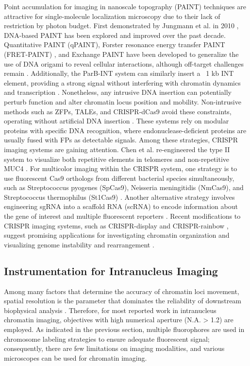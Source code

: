 Point accumulation for imaging in nanoscale topography (PAINT) techniques are attractive for single-molecule localization microscopy due to their lack of restriction by photon budget. First demonstrated by Jungmann et al. in 2010 \parencite{Jungmann2016}, DNA-based PAINT has been explored and improved over the past decade. Quantitative PAINT (qPAINT), Forster resonance energy transfer PAINT (FRET-PAINT) \parencite{Jungmann2016}, and Exchange PAINT have been developed to generalize the use of DNA origami to reveal cellular interactions, although off-target challenges remain \parencite{Nieves2018}. Additionally, the ParB-INT system can similarly insert a ~1 kb INT element, providing a strong signal without interfering with chromatin dynamics and transcription \parencite{Saad2014}. Nonetheless, any intrusive DNA insertion can potentially perturb function and alter chromatin locus position and mobility. Non-intrusive methods such as ZFPs, TALEs, and CRISPR-dCas9 avoid these constraints, operating without artificial DNA insertion \parencite{Chen2016,Lindhout2007,Ma2013}. These systems rely on modular proteins with specific DNA recognition, where endonuclease-deficient proteins are usually fused with FPs as detectable signals. Among these strategies, CRISPR imaging systems are gaining attention. Chen et al. re-engineered the type II system to visualize both repetitive elements in telomeres and non-repetitive MUC4 \parencite{Chen2013}. For multicolor imaging within the CRISPR system, one strategy is to use fluorescent Cas9 orthologs from different bacterial species simultaneously, such as Streptococcus pyogenes (SpCas9), Neisseria meningitidis (NmCas9), and Streptococcus thermophilus (St1Cas9) \parencite{Ma2015}. Another alternative strategy involves engineering sgRNA into a scaffold RNA (scRNA) to encode information about the gene of interest and multiple fluorescent reporters \parencite{Zalatan2015}. Recent modifications to CRISPR imaging systems, such as CRISPR-display \parencite{Shechner2015} and CRISPR-rainbow \parencite{Ma2016}, suggest promising applications for investigating chromatin organization and visualizing genome instability and rearrangement \parencite{Chen2016}.


\subsection{Instrumentation for Intranucleus Imaging}

Among many factors that determine the accuracy of chromatin loci movement, spatial resolution is the parameter that dominates the reliability of downstream biophysical analysis \parencite{Burov2013}. Therefore, for most reported work in intranucleus chromatin imaging, objectives with high numerical aperture (N.A. > 1.2) are employed. As indicated in the previous section, multiple fluorophores are used in chromosome labeling strategies to ensure adequate fluorescent signal; consequently, there are few limitations on imaging modalities, and various microscopes can be used for chromatin imaging.

